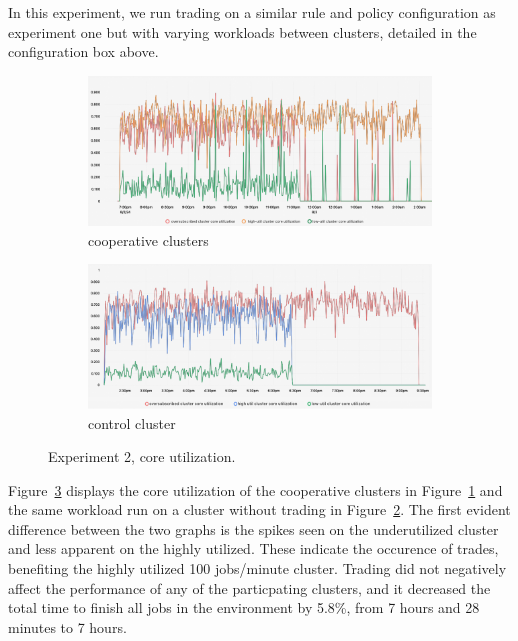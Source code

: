 In this experiment, we run trading on a similar rule and policy configuration
as experiment one but with varying workloads between clusters, detailed in the
configuration box above. 

\begin{figure}[H]
\centering
\begin{subfigure}{.5\textwidth}
  \centering
  \includegraphics[width=.9\linewidth]{./figures/experiment-two/exp-two-coop.png}
  \caption{cooperative clusters}
  \label{fig:exp2coop}
\end{subfigure}%
\begin{subfigure}{.5\textwidth}
  \centering
  \includegraphics[width=.9\linewidth]{./figures/experiment-two/exp-two-control.png}
  \caption{control cluster}
  \label{fig:exp2control}
\end{subfigure}
\caption{Experiment 2, core utilization.}
\label{fig:exp2coreutil}
\end{figure}

Figure~\ref{fig:exp2coreutil} displays the core utilization of the cooperative
clusters in Figure~\ref{fig:exp2coop} and the same workload run on a cluster without
trading in Figure~\ref{fig:exp2control}.
The first evident difference between the two graphs is the spikes seen on the
underutilized cluster and less apparent on the highly utilized. These
indicate the occurence of trades, benefiting the highly utilized 100
jobs/minute cluster. Trading did not negatively affect the performance of any
of the particpating clusters, and it decreased the total time to finish all jobs in
the environment by 5.8\%, from 7 hours and 28 minutes to 7 hours.

